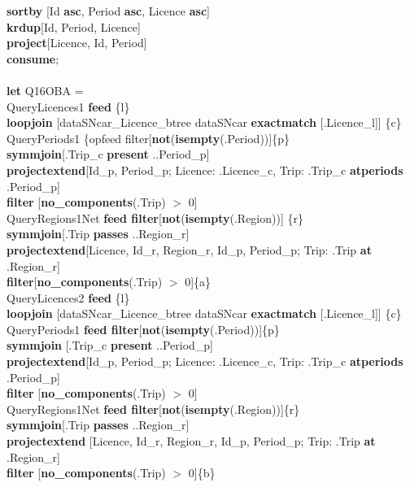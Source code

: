 \documentclass[a4paper]{article}
\newcommand{\op}[1]{\textbf{#1}}
\begin{document}
\begin{scriptsize}
\begin{tabbing}
\>\op{sortby} [Id \op{asc}, Period \op{asc}, Licence \op{asc}]\\
\>\op{krdup}[Id, Period, Licence]\\
\>\op{project}[Licence, Id, Period]\\
\op{consume};\\
\\
\op{let} Q16OBA =\\
\>QueryLicences1 \op{feed} \{l\}\\
\>\>\>\op{loopjoin} [dataSNcar\_Licence\_btree dataSNcar \op{exactmatch}
[.Licence\_l]] \{c\}\\
\>\>QueryPeriods1 \{op{feed filter}[\op{not}(\op{isempty}(.Period))]\{p\}\\
\>\>\op{symmjoin}[.Trip\_c \op{present} ..Period\_p]\\
\>\>\>\op{projectextend}[Id\_p, Period\_p; Licence: .Licence\_c, Trip: .Trip\_c
\op{atperiods} .Period\_p]\\
\>\>\>\op{filter} [\op{no\_components}(.Trip) $>$ 0]\\
\>\>QueryRegions1Net \op{feed filter}[\op{not}(\op{isempty}(.Region))] \{r\}\\
\>\>\op{symmjoin}[.Trip \op{passes} ..Region\_r]\\
\>\>\op{projectextend}[Licence, Id\_r, Region\_r, Id\_p, Period\_p; Trip: .Trip
\op{at} .Region\_r]\\
\>\>\op{filter}[\op{no\_components}(.Trip) $>$ 0]\{a\}\\
\>QueryLicences2 \op{feed} \{l\}\\
\>\>\>\op{loopjoin} [dataSNcar\_Licence\_btree dataSNcar \op{exactmatch}
[.Licence\_l]] \{c\}\\
\>\>QueryPeriods1 \op{feed filter}[\op{not}(\op{isempty}(.Period))]\{p\}\\
\>\>\op{symmjoin} [.Trip\_c \op{present} ..Period\_p]\\
\>\>\>\op{projectextend}[Id\_p, Period\_p; Licence: .Licence\_c, Trip: .Trip\_c
\op{atperiods} .Period\_p]\\
\>\>\>\op{filter} [\op{no\_components}(.Trip) $>$ 0]\\
\>\>QueryRegions1Net \op{feed filter}[\op{not}(\op{isempty}(.Region))]\{r\}\\
\>\>\op{symmjoin}[.Trip \op{passes} ..Region\_r]\\
\>\>\op{projectextend} [Licence, Id\_r, Region\_r, Id\_p, Period\_p; Trip: .Trip
\op{at} .Region\_r]\\
\>\>\op{filter} [\op{no\_components}(.Trip) $>$ 0]\{b\}\\

\end{tabbing}
\end{scriptsize}
\end{document}
